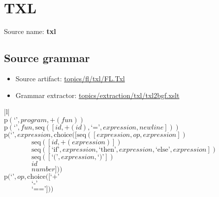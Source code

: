 \chapter{TXL}

 Source name: \textbf{txl}

\section{Source grammar}

\begin{itemize}
\item Source artifact: \href{http://github.com/grammarware/slps/blob/master/topics/fl/txl/FL.Txl}{topics/fl/txl/FL.Txl}
\item Grammar extractor: \href{http://github.com/grammarware/slps/blob/master/topics/extraction/txl/txl2bgf.xslt}{topics/extraction/txl/txl2bgf.xslt}
\end{itemize}

\footnotesize\begin{center}\begin{tabular}{|l|}\hline
{}
\\\hline
$\mathrm{p}(\text{`'},\mathit{program},{+}\left(\mathit{fun}\right))$	\\
$\mathrm{p}(\text{`'},\mathit{fun},\mathrm{seq}\left(\left[\mathit{id}, {+}\left(\mathit{id}\right), \text{`='}, \mathit{expression}, \mathit{newline}\right]\right))$	\\
$\mathrm{p}(\text{`'},\mathit{expression},\mathrm{choice}([\mathrm{seq}\left(\left[\mathit{expression}, \mathit{op}, \mathit{expression}\right]\right)$\\$\qquad\qquad\mathrm{seq}\left(\left[\mathit{id}, {+}\left(\mathit{expression}\right)\right]\right)$\\$\qquad\qquad\mathrm{seq}\left(\left[\text{`if'}, \mathit{expression}, \text{`then'}, \mathit{expression}, \text{`else'}, \mathit{expression}\right]\right)$\\$\qquad\qquad\mathrm{seq}\left(\left[\text{`('}, \mathit{expression}, \text{`)'}\right]\right)$\\$\qquad\qquad\mathit{id}$\\$\qquad\qquad\mathit{number}]))$	\\
$\mathrm{p}(\text{`'},\mathit{op},\mathrm{choice}([\text{`+'}$\\$\qquad\qquad\text{`-'}$\\$\qquad\qquad\text{`=='}]))$	\\
\hline\end{tabular}\end{center}



